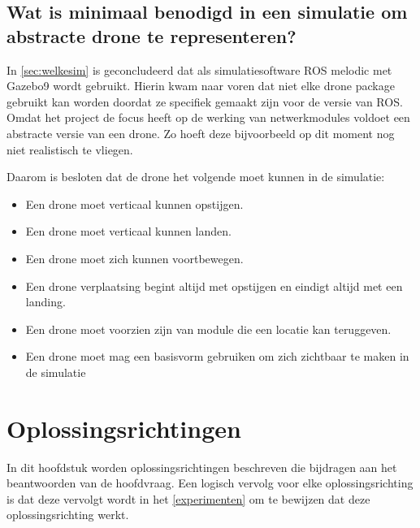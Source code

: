 \documentclass[a4paper, 11pt, oneside]{report}
\begin{document}
 


\section[minimaal benodigd om een abstracte drone te representeren]{Wat is minimaal benodigd in een simulatie om abstracte drone te representeren?}
\label{sec:dronekeuze}

In \autoref{sec:welkesim} is geconcludeerd dat als simulatiesoftware ROS melodic met Gazebo9 wordt gebruikt.
Hierin kwam naar voren dat niet elke drone package gebruikt kan worden doordat ze specifiek gemaakt zijn voor de versie van ROS.
Omdat het project de focus heeft op de werking van netwerkmodules voldoet een abstracte versie van een drone.
Zo hoeft deze bijvoorbeeld op dit moment nog niet realistisch te vliegen.

Daarom is besloten dat de drone het volgende moet kunnen in de simulatie:

\begin{itemize}
	\item Een drone moet verticaal kunnen opstijgen.
	\item Een drone moet verticaal kunnen landen.
	\item Een drone moet zich kunnen voortbewegen.
	\item Een drone verplaatsing begint altijd met opstijgen en eindigt altijd met een landing.
	\item Een drone moet voorzien zijn van module die een locatie kan teruggeven. 
	\item Een drone moet mag een basisvorm gebruiken om zich zichtbaar te maken in de simulatie
\end{itemize}


\chapter{Oplossingsrichtingen}



In dit hoofdstuk worden oplossingsrichtingen beschreven die bijdragen aan het beantwoorden van de hoofdvraag. 
Een logisch vervolg voor elke oplossingsrichting is dat deze vervolgt wordt in het \autoref{experimenten}  om te bewijzen dat deze oplossingsrichting werkt.
\end{document}
